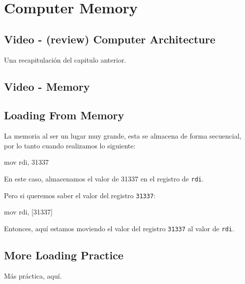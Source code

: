 \section{Computer Memory}\label{sec:02_computer_memory}

\sectiontoc

\subsection{Video - (review) Computer Architecture}\label{subsec:video_review_computer_architecture}

Una recapitulación del capitulo anterior.

\subsection{Video - Memory}\label{subsec:video_memory}

\subsection{Loading From Memory}\label{subsec:loading_from_memory}

La memoria al ser un lugar muy grande, esta se almacena de forma
secuencial, por lo tanto cuando realizamos lo siguiente:

\begin{codebox}[ASM]{}
	mov rdi, 31337
\end{codebox}

En este caso, almacenamos el valor de 31337 en el registro de \texttt{rdi}.

Pero si queremos saber el valor del registro \texttt{31337}:

\begin{codebox}[ASM]{}
	mov rdi, [31337]
\end{codebox}

Entonces, aquí estamos moviendo el valor del registro \texttt{31337} al valor de \texttt{rdi}.

\subsection{More Loading Practice}\label{subsec:more_loading_practice}

Más práctica, aquí.

